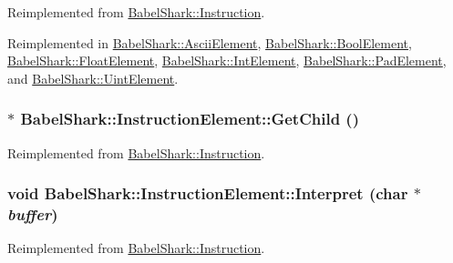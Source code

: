 Reimplemented from \hyperlink{class_babel_shark_1_1_instruction_a1d1dd6ff30235fd6842fcf4204f7698}{BabelShark::Instruction}.

Reimplemented in \hyperlink{class_babel_shark_1_1_ascii_element_a10391d6cea4ab7ad45be370fed9d4d0}{BabelShark::AsciiElement}, \hyperlink{class_babel_shark_1_1_bool_element_7908eb1bccd3d590bfa3da4735bcec76}{BabelShark::BoolElement}, \hyperlink{class_babel_shark_1_1_float_element_7c8e429b760e1e24985e3046d4640674}{BabelShark::FloatElement}, \hyperlink{class_babel_shark_1_1_int_element_c6999927ab0af83714479752fda88f9b}{BabelShark::IntElement}, \hyperlink{class_babel_shark_1_1_pad_element_aa1ddf32a942c6ea6c63eefe67f2521d}{BabelShark::PadElement}, and \hyperlink{class_babel_shark_1_1_uint_element_06162488c1a349e17d165d038e5cd646}{BabelShark::UintElement}.\hypertarget{class_babel_shark_1_1_instruction_element_747402ebce23651b77cad508c223ba62}{
\subsubsection[{GetChild}]{ $\ast$ BabelShark::InstructionElement::GetChild ()}}
\label{class_babel_shark_1_1_instruction_element_747402ebce23651b77cad508c223ba62}




Reimplemented from \hyperlink{class_babel_shark_1_1_instruction_709aac58cbdc516fcedc3bbcdd94795d}{BabelShark::Instruction}.\hypertarget{class_babel_shark_1_1_instruction_element_7795ad0b2acedb5a2b68d2c3e63351ae}{
\subsubsection[{Interpret}]{\setlength{\rightskip}{0pt plus 5cm}void BabelShark::InstructionElement::Interpret (char $\ast$ {\em buffer})}}
\label{class_babel_shark_1_1_instruction_element_7795ad0b2acedb5a2b68d2c3e63351ae}




Reimplemented from \hyperlink{class_babel_shark_1_1_instruction_bfbceb493d151b2e255c7c8cbac7a476}{BabelShark::Instruction}.

